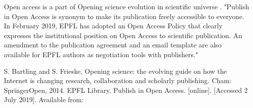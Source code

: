 \documentclass[12pt]{article}
\begin{document}
Open access is a part of Opening science evolution in scientific universe \cite{Bartling2014}.
"Publish in Open Access is synonym to make its publication freely accessible to everyone. In February 2019, EPFL has adopted an Open Access Policy that clearly expresses the institutional position on Open Access to scientific
publication. An amendment to the publication agreement and an email template are also available for EPFL authors as negotiation tools with publishers." \cite{EPFLlibrary2019}
 \begin{thebibliography}{1}
  S. Bartling and S. Frieske, Opening science: the evolving guide on how the Internet is changing research,
  collaboration and scholarly publishing. Cham: SpringerOpen, 2014.
  EPFL Library, Publish in Open Access. [online]. [Accessed 2 July 2019]. Available from:
  \end{thebibliography}
\end{document}
